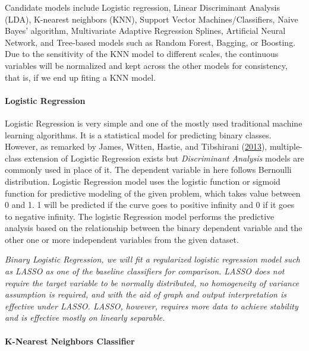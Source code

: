 \documentclass[
  10pt,
]{article}
\begin{document}
Candidate models include Logistic regression, Linear Discriminant Analysis (LDA), K-nearest neighbors (KNN), Support Vector Machines/Classifiers, Naive Bayes' algorithm, Multivariate Adaptive Regression Splines, Artificial Neural Network, and Tree-based models such as Random Forest, Bagging, or Boosting. Due to the sensitivity of the KNN model to different scales, the continuous variables will be normalized and kept across the other models for consistency, that is, if we end up fiting a KNN model.

\hypertarget{logistic-regression}{%
\paragraph{Logistic Regression}\label{logistic-regression}}

Logistic Regression is very simple and one of the mostly used traditional machine learning algorithms. It is a statistical model for predicting binary classes. However, as remarked by James, Witten, Hastie, and Tibshirani (\protect\hyperlink{ref-james2013introduction}{2013}), multiple-class extension of Logistic Regression exists but \emph{Discriminant Analysis} models are commonly used in place of it. The dependent variable in here follows Bernoulli distribution. Logistic Regression model uses the logistic function or sigmoid function for predictive modeling of the given problem, which takes value between 0 and 1. 1 will be predicted if the curve goes to positive infinity and 0 if it goes to negative infinity. The logistic Regression model performs the predictive analysis based on the relationship between the binary dependent variable and the other one or more independent variables from the given dataset.

\emph{Binary Logistic Regression, we will fit a regularized logistic regression model such as LASSO as one of the baseline classifiers for comparison. LASSO does not require the target variable to be normally distributed, no homogeneity of variance assumption is required, and with the aid of graph and output interpretation is effective under LASSO. LASSO, however, requires more data to achieve stability and is effective mostly on linearly separable.}

\hypertarget{k-nearest-neighbors-classifier}{%
\paragraph{K-Nearest Neighbors Classifier}\label{k-nearest-neighbors-classifier}}
\end{document}
